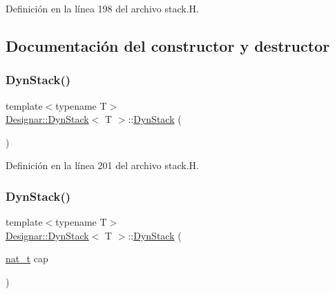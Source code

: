 Definición en la línea 198 del archivo stack.\+H.



\subsection{Documentación del constructor y destructor}
\mbox{\label{class_designar_1_1_dyn_stack_a974a328c42eeb04114249c321a7d2ebe}} 
\subsubsection{\texorpdfstring{Dyn\+Stack()}{DynStack()}\hspace{0.1cm}{\footnotesize\ttfamily [1/4]}}
{\footnotesize\ttfamily template$<$typename T$>$ \\
\hyperlink{class_designar_1_1_dyn_stack}{Designar\+::\+Dyn\+Stack}$<$ T $>$\+::\hyperlink{class_designar_1_1_dyn_stack}{Dyn\+Stack} (\begin{DoxyParamCaption}{ }\end{DoxyParamCaption})\hspace{0.3cm}{\ttfamily [inline]}}



Definición en la línea 201 del archivo stack.\+H.

\mbox{\label{class_designar_1_1_dyn_stack_afe8f19b00f9c0cb21ea2d64fedadcb5e}} 
\subsubsection{\texorpdfstring{Dyn\+Stack()}{DynStack()}\hspace{0.1cm}{\footnotesize\ttfamily [2/4]}}
{\footnotesize\ttfamily template$<$typename T$>$ \\
\hyperlink{class_designar_1_1_dyn_stack}{Designar\+::\+Dyn\+Stack}$<$ T $>$\+::\hyperlink{class_designar_1_1_dyn_stack}{Dyn\+Stack} (\begin{DoxyParamCaption}\item[{\hyperlink{namespace_designar_aa72662848b9f4815e7bf31a7cf3e33d1}{nat\+\_\+t}}]{cap }\end{DoxyParamCaption})\hspace{0.3cm}{\ttfamily [inline]}}




